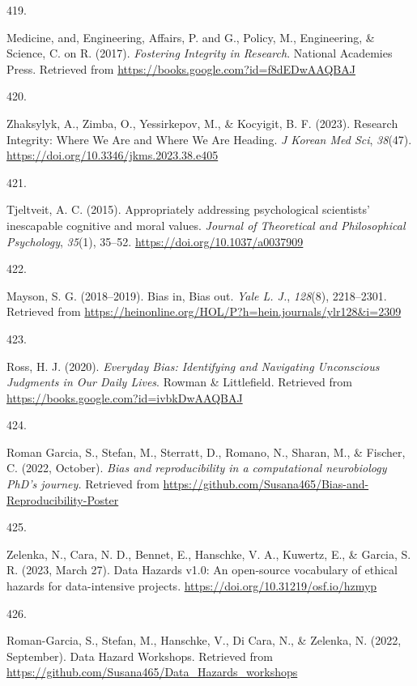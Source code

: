 \documentclass[
  11pt,
  letterpaper,
]{scrreprt}
\newlength{\cslhangindent}
\newlength{\csllabelwidth}
\newenvironment{CSLReferences}[2] %
 {\begin{list}{}{%
  \setlength{\itemindent}{0pt}
  \setlength{\leftmargin}{0pt}
  \setlength{\parsep}{0pt}
  \ifodd #1
   \setlength{\leftmargin}{\cslhangindent}
   \setlength{\itemindent}{-1\cslhangindent}
  \fi
  \setlength{\itemsep}{#2\baselineskip}}}
 {\end{list}}
\newcommand{\CSLLeftMargin}[1]{\parbox[t]{\csllabelwidth}{\strut#1\strut}}
\newcommand{\CSLRightInline}[1]{\parbox[t]{\linewidth - \csllabelwidth}{\strut#1\strut}}
\begin{document}
\begin{CSLReferences}{0}{0}
\CSLLeftMargin{419. }%
\CSLRightInline{Medicine, and, Engineering, Affairs, P. and G., Policy,
M., Engineering, \& Science, C. on R. (2017). \emph{Fostering
{Integrity} in {Research}}. National Academies Press. Retrieved from
\url{https://books.google.com?id=f8dEDwAAQBAJ}}

\CSLLeftMargin{420. }%
\CSLRightInline{Zhaksylyk, A., Zimba, O., Yessirkepov, M., \& Kocyigit,
B. F. (2023). Research {Integrity}: {Where We Are} and {Where We Are
Heading}. \emph{J Korean Med Sci}, \emph{38}(47).
\url{https://doi.org/10.3346/jkms.2023.38.e405}}

\CSLLeftMargin{421. }%
\CSLRightInline{Tjeltveit, A. C. (2015). Appropriately addressing
psychological scientists' inescapable cognitive and moral values.
\emph{Journal of Theoretical and Philosophical Psychology},
\emph{35}(1), 35--52. \url{https://doi.org/10.1037/a0037909}}

\CSLLeftMargin{422. }%
\CSLRightInline{Mayson, S. G. (2018--2019). Bias in, {Bias} out.
\emph{Yale L. J.}, \emph{128}(8), 2218--2301. Retrieved from
\url{https://heinonline.org/HOL/P?h=hein.journals/ylr128&i=2309}}

\CSLLeftMargin{423. }%
\CSLRightInline{Ross, H. J. (2020). \emph{Everyday {Bias}: {Identifying}
and {Navigating Unconscious Judgments} in {Our Daily Lives}}. Rowman \&
Littlefield. Retrieved from
\url{https://books.google.com?id=ivbkDwAAQBAJ}}

\CSLLeftMargin{424. }%
\CSLRightInline{Roman Garcia, S., Stefan, M., Sterratt, D., Romano, N.,
Sharan, M., \& Fischer, C. (2022, October). \emph{Bias and
reproducibility in a computational neurobiology {PhD}'s journey.}
Retrieved from
\url{https://github.com/Susana465/Bias-and-Reproducibility-Poster}}

\CSLLeftMargin{425. }%
\CSLRightInline{Zelenka, N., Cara, N. D., Bennet, E., Hanschke, V. A.,
Kuwertz, E., \& Garcia, S. R. (2023, March 27). Data {Hazards} v1.0: An
open-source vocabulary of ethical hazards for data-intensive projects.
\url{https://doi.org/10.31219/osf.io/hzmyp}}

\CSLLeftMargin{426. }%
\CSLRightInline{Roman-Garcia, S., Stefan, M., Hanschke, V., Di Cara, N.,
\& Zelenka, N. (2022, September). Data {Hazard Workshops}. Retrieved
from \url{https://github.com/Susana465/Data_Hazards_workshops}}


\end{CSLReferences}
\end{document}
